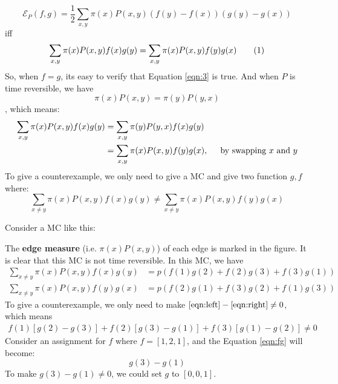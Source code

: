 \documentclass{article}
\newcommand\numberthis{\addtocounter{equation}{1}\tag{\theequation}}
\begin{document}
\[\mathcal{E}_P(f, g) = \frac{1}{2}\sum_{x,y}\pi(x)P(x,y)(f(y) - f(x))(g(y) - g(x))\]
iff
\[\sum_{x,y}\pi(x)P(x,y)f(x)g(y) = \sum_{x,y} \pi(x)P(x,y) f(y)g(x) \numberthis \label{eqn:3}\]
So, when $f = g$, its easy to verify that Equation \eqref{eqn:3} is true.
And when $P$ is time reversible, we have
\[\pi(x)P(x, y) = \pi(y)P(y,x)\]
, which means:
\begin{align*}
    \sum_{x,y} \pi(x)P(x,y)f(x)g(y) &= \sum_{x,y} \pi(y)P(y,x)f(x)g(y) \\
  &= \sum_{x,y} \pi(x)P(x,y)f(y)g(x), \hspace{0.5cm} \mbox{by swapping $x$ and $y$}
\end{align*}
To give a counterexample, we only need to give a MC and give two function $g, f$ where:
\[\sum_{x\not=y} \pi(x)P(x,y)f(x)g(y) \not= \sum_{x\not=y} \pi(x)P(x,y)f(y)g(x)\]

Consider a MC like this:
\begin{center}
\end{center}
The \textbf{edge measure} (i.e. $\pi(x)P(x,y)$) of each edge is marked in the figure.
It is clear that this MC is not time reversible.
In this MC, we have
\begin{align}
  \sum_{x\not=y}\pi(x)P(x,y)f(x)g(y) &= p(f(1)g(2) + f(2)g(3) + f(3)g(1))  \label{eqn:left} \\
  \sum_{x\not=y}\pi(x)P(x,y)f(y)g(x) &= p(f(2)g(1) + f(3)g(2) + f(1)g(3))  \label{eqn:right}
\end{align}
To give a counterexample, we only need to make $\eqref{eqn:left} - \eqref{eqn:right} \not= 0$, which means
\begin{align}
f(1)[g(2) - g(3)] + f(2)[g(3) - g(1)] + f(3)[g(1) - g(2)] \not= 0 \label{eqn:fg}
\end{align}
Consider an assignment for $f$ where $f = [1, 2, 1]$, and the Equation \eqref{eqn:fg} will become:
\[g(3) - g(1)\]
To make $g(3) - g(1)\not=0$, we could set $g$ to $[0, 0, 1]$.
\end{document}
